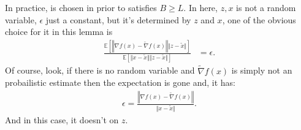 \documentclass[12pt]{article}
\newcommand{\expect}{\ensuremath{\mathbb E}}
\begin{document}
        \begin{remark}
            In practice, is chosen in prior to satisfies $B \ge L$. 
            In here, $z, x$ is not a random variable, $\epsilon$ just a constant, but it's determined by $z$ and $x$, one of the obvious choice for it in this lemma is
            \begin{align*}
                \frac{
                \expect \left[
                    \left\Vert \nabla f(x) - \tilde \nabla f(x) \right\Vert \Vert z - \tilde x\Vert
                \right]
                }{
                \expect \left[
                    \Vert x - \tilde x\Vert\Vert z - \tilde x\Vert
                \right]
                } &= \epsilon. 
            \end{align*}
            Of course, look, if there is no random variable and $\tilde \nabla f(x)$ is simply not an probailistic estimate then the expectation is gone and, it has: 
            \begin{align*}
                \epsilon = \frac{\left\Vert
                    \nabla f(x) - \tilde \nabla f(x)
                \right\Vert}{\Vert x - \tilde x\Vert}.
            \end{align*}
            And in this case, it doesn't on $z$. 
        \end{remark}
\end{document}
